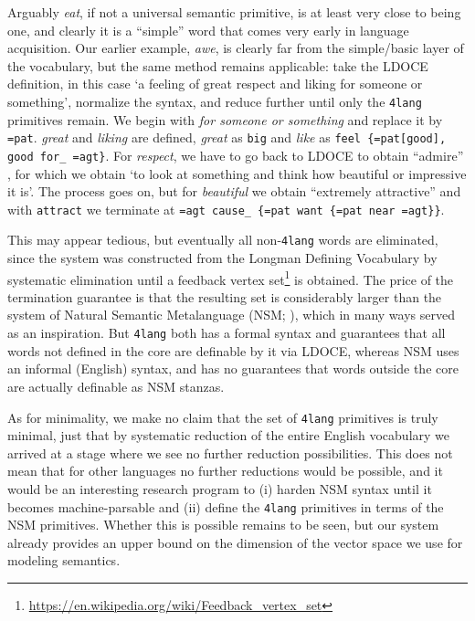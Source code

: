 \documentclass[output=paper]{langscibook}
\begin{document}
Arguably \textit{eat}, if not a universal semantic primitive, is at least very
close to being one, and clearly it is a ``simple'' word \citep{Kornai:2021} that
comes very early in language acquisition. Our earlier example, \textit{awe}, is
clearly far from the simple/basic layer of the vocabulary, but the same method
remains applicable: take the LDOCE definition, in this case `a feeling of
great respect and liking for someone or something', normalize the syntax, and
reduce further until only the \texttt{4lang} primitives remain. We begin with
\textit{for someone or something} and replace it by \texttt{=pat}. \textit{great}
and \textit{liking} are defined, \textit{great} as \texttt{big} and \textit{like} as \texttt{feel \{=pat[good], good for\_ =agt\}}. For \textit{respect}, we have to
go back to LDOCE to obtain ``admire'' , for which we obtain `to look at something
and think how beautiful or impressive it is'. The process goes on, but for
\textit{beautiful} we obtain “extremely attractive” and with \texttt{attract} we
terminate at \texttt{=agt cause\_ \{=pat want \{=pat near =agt\}\}}.

This may appear tedious, but eventually all non-\texttt{4lang} words are
eliminated, since the system was constructed from the Longman Defining
Vocabulary by systematic elimination \citep{Acs:2019b} until a
feedback vertex set\footnote{\url{https://en.wikipedia.org/wiki/Feedback_vertex_set}} is obtained. The price of the termination guarantee is that the resulting set
is considerably larger than the system of Natural Semantic Metalanguage
(NSM; \cite{Wierzbicka:1992,Wierzbicka:1996,Goddard:2002}), which in many ways
served as an inspiration. But \texttt{4lang} both has a formal syntax and
guarantees that all words not defined in the core are definable by it via
LDOCE, whereas NSM uses an informal (English) syntax, and has no guarantees
that words outside the core are actually definable as NSM stanzas.

As for minimality, we make no claim that the set of \texttt{4lang} primitives
is truly minimal, just that by systematic reduction of the entire English
vocabulary we arrived at a stage where we see no further reduction
possibilities.  This does not mean that for other languages no further
reductions would be possible, and it would be an interesting research program
to (i) harden NSM syntax until it becomes machine-parsable and (ii) define the
\texttt{4lang} primitives in terms of the NSM primitives. Whether this is
possible remains to be seen, but our system already provides an upper bound on
the dimension of the vector space we use for modeling semantics.
\end{document}
